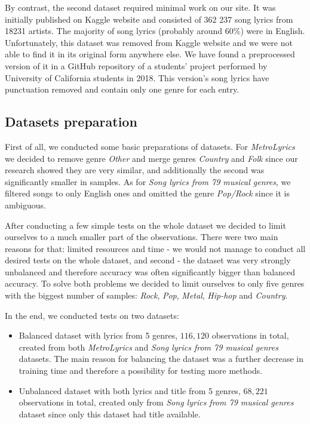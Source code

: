 By contrast, the second dataset required minimal work on our site. It was initially published on Kaggle website and consisted of 362 237 song lyrics from 18231 artists. The majority of song lyrics (probably around 60\%) were in English. Unfortunately, this dataset was removed from Kaggle website and we were not able to find it in its original form anywhere else. We have found a preprocessed version of it in a GitHub repository of a students' project performed by University of California students in 2018. This version's song lyrics have punctuation removed and contain only one genre for each entry.

\subsection{Datasets preparation}\label{Datasets preparation}

First of all, we conducted some basic preparations of datasets.
For \textit{MetroLyrics} we decided to remove genre \textit{Other} and merge genres \textit{Country} and \textit{Folk} since  our research showed they are very similar, and additionally the second was significantly smaller in samples. As for \textit{Song lyrics from 79 musical genres}, we filtered songs to only English ones and omitted the genre \textit{Pop/Rock} since it is ambiguous.

After conducting a few simple tests on the whole dataset we decided to limit ourselves to a much smaller part of the observations. There were two main reasons for that: limited resources and time - we would not manage to conduct all desired tests on the whole dataset, and second - the dataset was very strongly unbalanced and therefore accuracy was often significantly bigger than balanced accuracy. To solve both problems we decided to limit ourselves to only five genres with the biggest number of samples: \textit{Rock}, \textit{Pop}, \textit{Metal}, \textit{Hip-hop} and \textit{Country}.

In the end, we conducted tests on two datasets:
\begin{itemize}
    \item Balanced dataset with lyrics from 5 genres, $116,120$ observations in total, created from both \textit{MetroLyrics} and \textit{Song lyrics from 79 musical genres} datasets. The main reason for balancing the dataset was a further decrease in training time and therefore a possibility for testing more methods.

    \item Unbalanced dataset with both lyrics and title from 5 genres, $68,221$ observations in total, created only from \textit{Song lyrics from 79 musical genres} dataset since only this dataset had title available.
\end{itemize}

